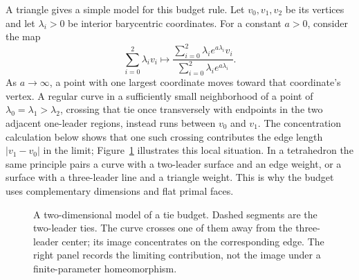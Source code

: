 A triangle gives a simple model for this budget rule. Let
$v_0,v_1,v_2$ be its vertices and let $\lambda_i>0$ be interior
barycentric coordinates. For a constant $a>0$, consider the map
\[
 \sum_{i=0}^2\lambda_i v_i
 \longmapsto
 \frac{\sum_{i=0}^2\lambda_i e^{a\lambda_i}v_i}
      {\sum_{i=0}^2\lambda_i e^{a\lambda_i}}.
\]
As $a\to\infty$, a point with one largest coordinate moves toward
that coordinate's vertex. A regular curve in a sufficiently small
neighborhood of a point of $\lambda_0=\lambda_1>\lambda_2$, crossing
that tie once transversely with endpoints in the
two adjacent one-leader regions, instead runs between $v_0$ and
$v_1$. The concentration calculation below shows that one such
crossing contributes the edge length $|v_1-v_0|$ in the limit;
Figure~\ref{lt:tie-model} illustrates this local situation. In a
tetrahedron the same principle pairs a curve with a two-leader
surface and an edge weight, or a surface with a three-leader line
and a triangle weight. This is why the budget uses complementary
dimensions and flat primal faces.

\begin{figure}[tb]
\centering
{}
\caption{A two-dimensional model of a tie budget. Dashed segments
are the two-leader ties. The curve crosses one of them away from
the three-leader center; its image concentrates on the corresponding
edge. The right panel records the limiting contribution, not the
image under a finite-parameter homeomorphism.}
\label{lt:tie-model}
\end{figure}

